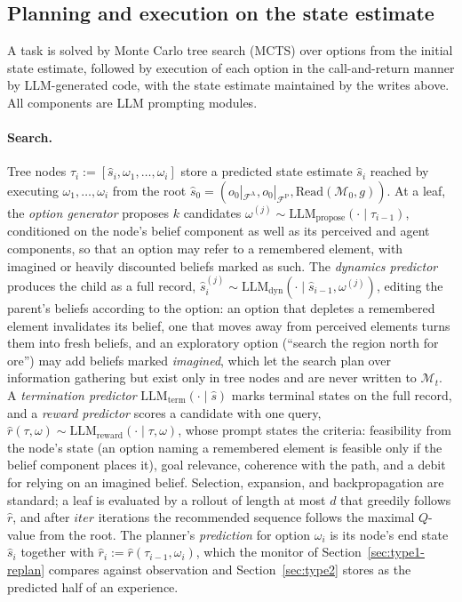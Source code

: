 \documentclass[10pt]{article}
\newcommand{\llm}[1]{\mathrm{LLM}_{\mathrm{#1}}}
\newcommand{\calF}{\mathcal{F}}
\newcommand{\calM}{\mathcal{M}}
\newcommand{\shat}{\hat{s}}
\newcommand{\FA}{\calF^{\mathrm{A}}}
\newcommand{\FP}{\calF^{\mathrm{P}}}
\newcommand{\Read}{\mathrm{Read}}
\begin{document}
\subsection{Planning and execution on the state estimate}
\label{sec:type1-plan}

A task is solved by Monte Carlo tree search (MCTS) \cite{kocsis2006uct,zhao2023llmmcts} over options from the initial state estimate, followed by execution of each option in the call-and-return manner by LLM-generated code, with the state estimate maintained by the writes above. All components are LLM prompting modules.

\paragraph{Search.}
Tree nodes $\tau_i:=[\shat_i,\omega_1,\dots,\omega_i]$ store a predicted state estimate $\shat_i$ reached by executing $\omega_1,\dots,\omega_i$ from the root $\shat_0=(o_0|_{\FA},o_0|_{\FP},\Read(\calM_0,g))$. At a leaf, the \emph{option generator} proposes $k$ candidates $\omega^{(j)}\sim\llm{propose}(\cdot\mid\tau_{i-1})$, conditioned on the node's belief component as well as its perceived and agent components, so that an option may refer to a remembered element, with imagined or heavily discounted beliefs marked as such. The \emph{dynamics predictor} produces the child as a full record, $\shat^{(j)}_i\sim\llm{dyn}(\cdot\mid\shat_{i-1},\omega^{(j)})$, editing the parent's beliefs according to the option: an option that depletes a remembered element invalidates its belief, one that moves away from perceived elements turns them into fresh beliefs, and an exploratory option (``search the region north for ore'') may add beliefs marked \emph{imagined}, which let the search plan over information gathering but exist only in tree nodes and are never written to $\calM_t$. A \emph{termination predictor} $\llm{term}(\cdot\mid\shat)$ marks terminal states on the full record, and a \emph{reward predictor} scores a candidate with one query, $\hat r(\tau,\omega)\sim\llm{reward}(\cdot\mid\tau,\omega)$, whose prompt states the criteria: feasibility from the node's state (an option naming a remembered element is feasible only if the belief component places it), goal relevance, coherence with the path, and a debit for relying on an imagined belief. Selection, expansion, and backpropagation are standard; a leaf is evaluated by a rollout of length at most $d$ that greedily follows $\hat r$, and after $\mathit{iter}$ iterations the recommended sequence follows the maximal $Q$-value from the root. The planner's \emph{prediction} for option $\omega_i$ is its node's end state $\shat_i$ together with $\hat r_i:=\hat r(\tau_{i-1},\omega_i)$, which the monitor of Section~\ref{sec:type1-replan} compares against observation and Section~\ref{sec:type2} stores as the predicted half of an experience.
\end{document}
